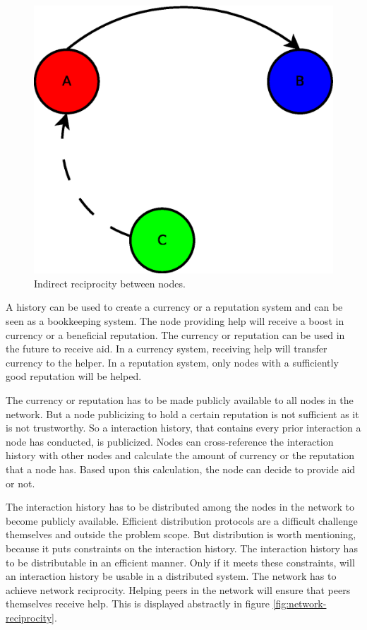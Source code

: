 \begin{figure}
	\centerline{\includegraphics[scale=0.3]{problemDescription/figs/indirect-reciprocity.eps}}
	\caption{Indirect reciprocity between nodes.}
	\label{fig:indirect-reciprocity}
\end{figure}

A history can be used to create a currency or a reputation system
and can be seen as a bookkeeping system.
The node providing help will receive a boost in currency or a beneficial reputation.
The currency or reputation can be used in the future to receive aid.
In a currency system, receiving help will transfer currency to the helper.
In a reputation system, only nodes with a sufficiently good reputation will be helped.

The currency or reputation has to be made publicly available to all nodes in the network.
But a node publicizing to hold a certain reputation is not sufficient as it is not trustworthy.
So a interaction history, that contains every prior interaction a node has conducted, is publicized.
Nodes can cross-reference the interaction history with other nodes and calculate the amount of currency 
or the reputation that a node has.
Based upon this calculation, the node can decide to provide aid or not.

The interaction history has to be distributed among the nodes in the network
to become publicly available.
Efficient distribution protocols are a difficult challenge themselves and outside the problem scope.
But distribution is worth mentioning, because it puts constraints on the interaction history.
The interaction history has to be distributable in an efficient manner.
Only if it meets these constraints, will an interaction history be usable in a distributed system.
The network has to achieve network reciprocity\cite{Nowak-Cooperation}.
Helping peers in the network will ensure that peers themselves receive help.
This is displayed abstractly in figure \ref{fig:network-reciprocity}.

